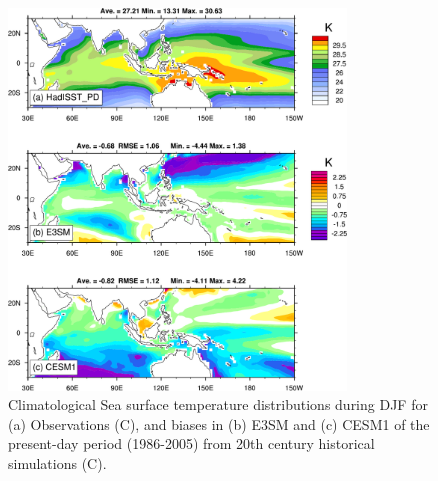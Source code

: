 \documentclass[draft,ms]{AGUTeX}
\begin{document}
\begin{article}
\begin{figure}[t]
  \begin{center}
   \noindent\includegraphics[width=0.8\textwidth]{./figs/f_E3SM_TS_DJF_diff.pdf}
  \end{center}
  \caption{Climatological Sea surface temperature distributions during DJF for (a) Observations \citep[HadISST,][]{Hurrell2008} (\deg C), and biases in (b) E3SM and (c) CESM1 of the present-day period (1986-2005) from 20th century historical simulations (\deg C).}
\label{f_E3SM_TS_DJF_diff}
\end{figure}




\end{article}
\end{document}
